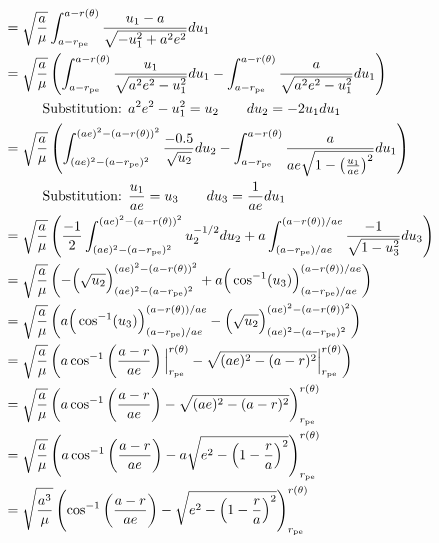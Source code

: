 \documentclass[../basicOrbitalDynamics.tex]{subfiles}
\begin{document}
\begin{align*}
        & =\sqrt{\frac{a}{\mu}}\int_{a-{r}_\text{pe}}^{a-r(\theta)}\frac{u_1-a}{\sqrt{-u_1^2+a^2e^2}}du_1                                                                                                                  \\
        & =\sqrt{\frac{a}{\mu}}\left(\int_{a-{r}_\text{pe}}^{a-r(\theta)}\frac{u_1}{\sqrt{a^2e^2-u_1^2}}du_1-\int_{a-{r}_\text{pe}}^{a-r(\theta)}\frac{a}{\sqrt{a^2e^2-u_1^2}}du_1\right)                                    \\
        & \phantom{=}\qquad{}\text{Substitution: }a^2e^2-u_1^2=u_2\qquad{}du_2=-2u_1du_1                                                                                                                                 \\
        & =\sqrt{\frac{a}{\mu}}\left(\int_{(ae)^2-(a-{r}_\text{pe})^2}^{(ae)^2-(a-r(\theta))^2}\frac{-0.5}{\sqrt{u_2}}du_2-\int_{a-{r}_\text{pe}}^{a-r(\theta)}\frac{a}{ae\sqrt{1-\left(\frac{u_1}{ae}\right)^2}}du_1\right) \\
        & \phantom{=}\qquad{}\text{Substitution: }\frac{u_1}{ae}=u_3\qquad{}du_3=\frac{1}{ae}du_1                                                                                                                        \\
        & =\sqrt{\frac{a}{\mu}}\left(\frac{-1}{2}\int_{(ae)^2-(a-{r}_\text{pe})^2}^{(ae)^2-(a-r(\theta))^2}u_2^{-1/2}du_2+a\int_{(a-{r}_\text{pe})/ae}^{(a-r(\theta))/ae}\frac{-1}{\sqrt{1-u_3^2}}du_3\right)                \\
        & =\sqrt{\frac{a}{\mu}}\left(-\Big(\sqrt{u_2}\Big)_{(ae)^2-(a-{r}_\text{pe})^2}^{(ae)^2-(a-r(\theta))^2}+a\Big(\cos^{-1}(u_3)\Big)_{(a-{r}_\text{pe})/ae}^{(a-r(\theta))/ae}\right)                                  \\
        & =\sqrt{\frac{a}{\mu}}\left(a\Big(\cos^{-1}(u_3)\Big)_{(a-{r}_\text{pe})/ae}^{(a-r(\theta))/ae}-\Big(\sqrt{u_2}\Big)_{(ae)^2-(a-{r}_\text{pe})^2}^{(ae)^2-(a-r(\theta))^2}\right)                                   \\
        & =\sqrt{\frac{a}{\mu}}\left(a\cos^{-1}\left(\frac{a-r}{ae}\right)\Big|_{{r}_\text{pe}}^{r(\theta)}-\sqrt{(ae)^2-(a-r)^2}\Big|_{{r}_\text{pe}}^{r(\theta)}\right)                                                    \\
        & =\sqrt{\frac{a}{\mu}}\left(a\cos^{-1}\left(\frac{a-r}{ae}\right)-\sqrt{(ae)^2-(a-r)^2}\right)_{{r}_\text{pe}}^{r(\theta)}                                                                                        \\
        & =\sqrt{\frac{a}{\mu}}\left(a\cos^{-1}\left(\frac{a-r}{ae}\right)-a\sqrt{e^2-\left(1-\frac{r}{a}\right)^2}\right)_{{r}_\text{pe}}^{r(\theta)}                                                                     \\
        & =\sqrt{\frac{a^3}{\mu}}\left(\cos^{-1}\left(\frac{a-r}{ae}\right)- \sqrt{e^2-\left(1-\frac{r}{a}\right)^2}\right)_{{r}_\text{pe}}^{r(\theta)}                                                                    \\
\end{align*}
\end{document}
